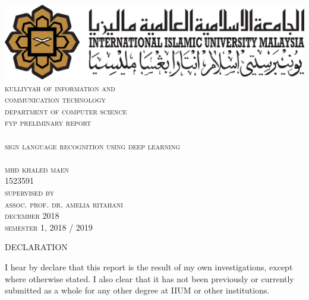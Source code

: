 \documentclass[12pt]{report}
\begin{document}
\begin{titlepage}
    \center
    \includegraphics[width = 15 cm]{./images/iium.png}
    \textsc{\LARGE }\\[1 cm]
    \textsc{\LARGE kulliyyah of information and}\\[.1 cm]
    \textsc{\LARGE communication technology}\\[1 cm]
    \textsc{\Large department of computer science}\\ [ .2 cm]
    \textsc{\large fyp preliminary report}\\ [.5 cm]
    \hrulefill \\[0.2cm]
    \textsc{\Large sign language recognition using deep learning}\\
    \hrulefill \\[1 cm]
    
    \textsc{\large mhd khaled maen}\\[.1 cm]
    \textsc{1523591}\\ [1 cm]
    
    
    \textsc{\large supervised by}\\[.1 cm]
    \textsc{\large assoc. prof. dr. amelia ritahani}\\[2 cm]
    
    \textsc{\large december} 2018\\ [.2 cm]
    \textsc{\large semester} 1, 2018 / 2019 \\
    
\end{titlepage}

\begin{center}
    \LARGE DECLARATION
\end{center}   

I hear by declare that this report is the result of my own investigations,
except where otherwise stated. I also clear that it 
has not been previously or currently submitted as a whole for any other degree 
at IIUM or other institutions.
\end{document}
